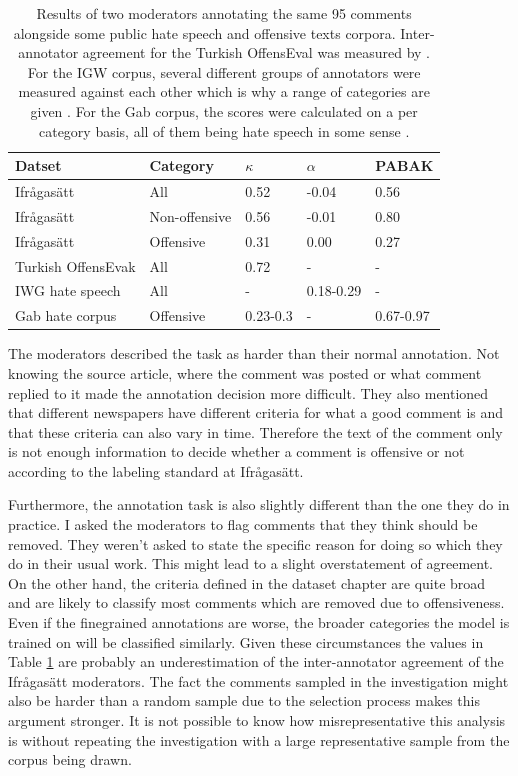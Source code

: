 \documentclass[nofilelist]{cslthse-msc}
\begin{document}
\begin{table}[t]
\centering
\begin{tabular}{@{}lllll@{}}
\toprule
Datset & Category  & $\kappa$ & $\alpha$ & PABAK \\ \midrule
Ifrågasätt & All  &  0.52 & -0.04 & 0.56 \\
Ifrågasätt & Non-offensive  & 0.56 & -0.01 & 0.80  \\
Ifrågasätt & Offensive  & 0.31 & 0.00 & 0.27  \\
Turkish OffensEvak & All  & 0.72 & - & - \\
IWG hate speech & All  & - & 0.18-0.29 & - \\
Gab hate corpus & Offensive & 0.23-0.3 & - & 0.67-0.97 \\
\bottomrule
\end{tabular}
\caption{Results of two moderators annotating the same 95 comments alongside some public hate speech and offensive texts corpora. Inter-annotator agreement for the Turkish OffensEval was measured by \citet{turkoffensive}. For the IGW corpus, several different groups of annotators were measured against each other which is why a range of categories are given \citep{DBLP:journals/corr/RossRCCKW17}. For the Gab corpus, the scores were calculated on a per category basis, all of them being hate speech in some sense \citep{kennedy_atari}.}
\label{tab:interannotatoragreement}
\end{table}


The moderators described the task as harder than their normal annotation. Not knowing the source article, where the comment was posted or what comment replied to it made the annotation decision more difficult. They also mentioned that different newspapers have different criteria for what a good comment is and that these criteria  can also vary in time. Therefore the text of the comment only is not enough information to decide whether a comment is offensive or not according to the labeling standard at Ifrågasätt. 

Furthermore, the annotation task is also slightly different than the one they do in practice. I asked the moderators to flag comments that they think should be removed. They weren't asked to state the specific reason for doing so which they do in their usual work. This might lead to a slight overstatement of agreement. On the other hand, the criteria defined in the dataset chapter are quite broad and are likely to classify most comments which are removed due to offensiveness. Even if the finegrained annotations are worse, the broader categories the model is trained on will be classified similarly. Given these circumstances the values in Table \ref{tab:interannotatoragreement} are probably an underestimation of the inter-annotator agreement of the Ifrågasätt moderators. The fact the comments sampled in the investigation might also be harder than a random sample due to the selection process makes this argument stronger. It is not possible to know how misrepresentative this analysis is without repeating the investigation with a large representative sample from the corpus being drawn.
\end{document}

